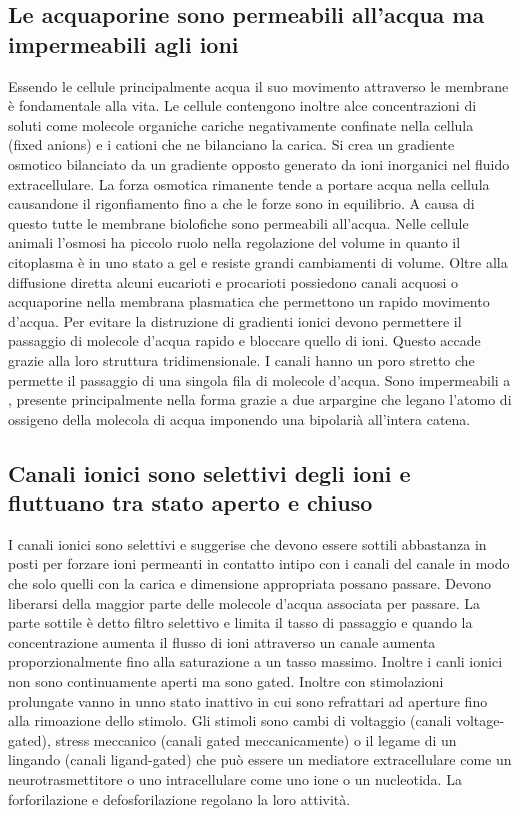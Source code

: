 \subsection{Le acquaporine sono permeabili all'acqua ma impermeabili agli ioni}
Essendo le cellule principalmente acqua il suo movimento attraverso le membrane \`e fondamentale alla vita. Le cellule contengono inoltre alce concentrazioni di soluti come molecole
organiche cariche negativamente confinate nella cellula (fixed anions) e i cationi che ne bilanciano la carica. Si crea un gradiente osmotico bilanciato da un gradiente opposto generato
da ioni inorganici nel fluido extracellulare. La forza osmotica rimanente tende a portare acqua nella cellula causandone il rigonfiamento fino a che le forze sono in equilibrio. A 
causa di questo tutte le membrane biolofiche sono permeabili all'acqua. Nelle cellule animali l'osmosi ha piccolo ruolo nella regolazione del volume in quanto il citoplasma \`e in uno
stato a gel e resiste grandi cambiamenti di volume. Oltre alla diffusione diretta alcuni eucarioti e procarioti possiedono canali acquosi o acquaporine nella membrana plasmatica che
permettono un rapido movimento d'acqua. Per evitare la distruzione di gradienti ionici devono permettere il passaggio di molecole d'acqua rapido e bloccare quello di ioni. Questo accade
grazie alla loro struttura tridimensionale. I canali hanno un poro stretto che permette il passaggio di una singola fila di molecole d'acqua. Sono impermeabili a , presente 
principalmente nella forma  grazie a due arpargine che legano l'atomo di ossigeno della molecola di acqua imponendo una bipolari\`a all'intera catena. 
\subsection{Canali ionici sono selettivi degli ioni e fluttuano tra stato aperto e chiuso}
I canali ionici sono selettivi e suggerise che devono essere sottili abbastanza in posti per forzare ioni permeanti in contatto intipo con i canali del canale in modo che solo quelli
con la carica e dimensione appropriata possano passare. Devono liberarsi della maggior parte delle molecole d'acqua associata per passare. La parte sottile \`e detto filtro selettivo
e limita il tasso di passaggio e quando la concentrazione aumenta il flusso di ioni attraverso un canale aumenta proporzionalmente fino alla saturazione a un tasso massimo. Inoltre i 
canli ionici non sono continuamente aperti ma sono gated. Inoltre con stimolazioni prolungate vanno in unno stato inattivo in cui sono refrattari ad aperture fino alla rimoazione dello
stimolo. Gli stimoli sono cambi di voltaggio (canali voltage-gated), stress meccanico (canali gated meccanicamente) o il legame di un lingando (canali ligand-gated) che pu\`o essere
un mediatore extracellulare come un neurotrasmettitore o uno intracellulare come uno ione o un nucleotida. La forforilazione e defosforilazione regolano la loro attivit\`a. 
